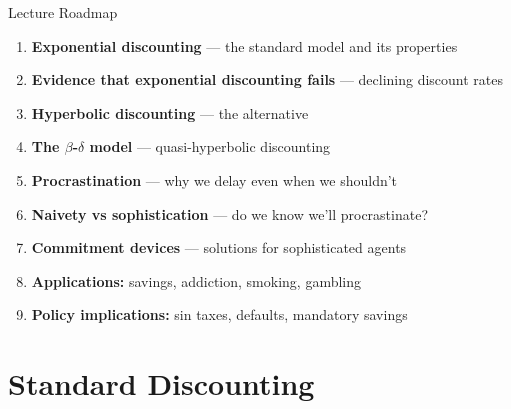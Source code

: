 \documentclass[aspectratio=169]{beamer}
\begin{document}
\begin{frame}{Lecture Roadmap}
\begin{enumerate}[<+->]
  \item \textbf{Exponential discounting} --- the standard model and its properties
  \item \textbf{Evidence that exponential discounting fails} --- declining discount rates
  \item \textbf{Hyperbolic discounting} --- the alternative
  \item \textbf{The $\beta$-$\delta$ model} --- quasi-hyperbolic discounting
  \item \textbf{Procrastination} --- why we delay even when we shouldn't
  \item \textbf{Naivety vs sophistication} --- do we know we'll procrastinate?
  \item \textbf{Commitment devices} --- solutions for sophisticated agents
  \item \textbf{Applications:} savings, addiction, smoking, gambling
  \item \textbf{Policy implications:} sin taxes, defaults, mandatory savings
\end{enumerate}
\end{frame}

\section{Standard Discounting}
\end{document}
